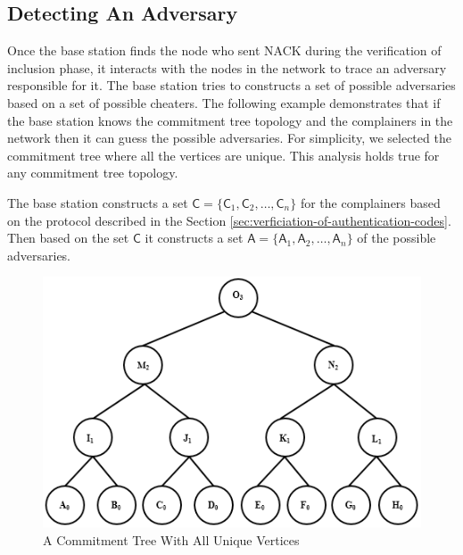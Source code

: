 	\subsection{Detecting An Adversary}
		Once the base station finds the node who sent NACK during the verification of inclusion phase, it interacts with the nodes in the network to trace an adversary responsible for it. 
		The base station tries to constructs a set of possible adversaries based on a set of possible cheaters.
		The following example demonstrates that if the base station knows the commitment tree topology and the complainers in the network then it can guess the possible adversaries.
		For simplicity, we selected the commitment tree where all the vertices are unique. 
		This analysis holds true for any commitment tree topology. 
		\begin{exmp}
			The base station constructs a set $\textsf{C} =\{\textsf{C}_{1},\textsf{C}_{2} , \dotsc, \textsf{C}_{n}\}$ for the complainers based on the protocol described in the Section \ref{sec:verficiation-of-authentication-codes}.
			Then based on the set $\textsf{C}$ it constructs a set $\textsf{A} = \{\textsf{A}_{1},\textsf{A}_{2},\dotsc,\textsf{A}_{n}\}$ of the possible adversaries. 
			\begin{figure}[t]
				\centering
				\includegraphics{images/possible-cheaters.png}
				\caption{A Commitment Tree With All Unique Vertices}
				\label{fig:cheating}
			\end{figure}


\end{exmp}
